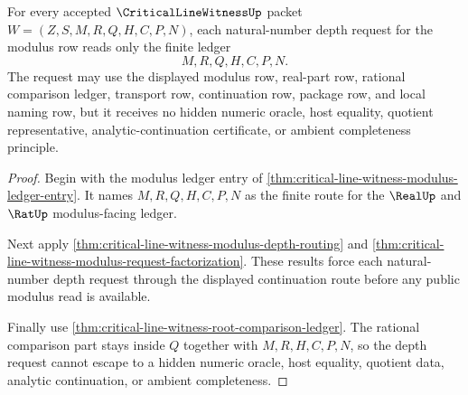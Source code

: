 \begin{theorem}
\label{thm:critical-line-witness-root-modulus-ledger}
For every accepted $\CriticalLineWitnessUp$ packet $W=(Z,S,M,R,Q,H,C,P,N)$, each natural-number depth request for the modulus row reads only the finite ledger
$$
M,R,Q,H,C,P,N.
$$
The request may use the displayed modulus row, real-part row, rational comparison ledger, transport row, continuation row, package row, and local naming row, but it receives no hidden numeric oracle, host equality, quotient representative, analytic-continuation certificate, or ambient completeness principle.
\end{theorem}
\begin{proof}
Begin with the modulus ledger entry of \autoref{thm:critical-line-witness-modulus-ledger-entry}. It names $M,R,Q,H,C,P,N$ as the finite route for the $\RealUp$ and $\RatUp$ modulus-facing ledger.

Next apply \autoref{thm:critical-line-witness-modulus-depth-routing} and \autoref{thm:critical-line-witness-modulus-request-factorization}. These results force each natural-number depth request through the displayed continuation route before any public modulus read is available.

Finally use \autoref{thm:critical-line-witness-root-comparison-ledger}. The rational comparison part stays inside $Q$ together with $M,R,H,C,P,N$, so the depth request cannot escape to a hidden numeric oracle, host equality, quotient data, analytic continuation, or ambient completeness.
\end{proof}

